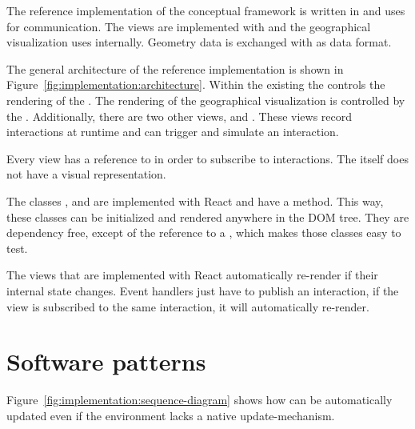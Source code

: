 The reference implementation of the conceptual framework is written in  and uses  for communication.
The views are implemented with  and the geographical visualization uses  internally.
Geometry data is exchanged with  as data format.

The general architecture of the reference implementation is shown in Figure~\ref{fig:implementation:architecture}.
Within the existing \visan{} the  controls the rendering of the \tmap{}.
The rendering of the geographical visualization is controlled by the .
Additionally, there are two other views,  and .
These views record interactions at runtime and can trigger and simulate an interaction.

Every view has a reference to  in order to subscribe to interactions.
The  itself does not have a visual representation.

The classes ,  and  are implemented with React and have a  method.
This way, these classes can be initialized and rendered anywhere in the DOM tree.
They are dependency free, except of the reference to a , which makes those classes easy to test.

The views that are implemented with React automatically re-render if their internal state changes.
Event handlers just have to publish an interaction, if the view is subscribed to the same interaction, it will automatically re-render.

\section{Software patterns}\label{sec:implementation:patterns}
Figure~\ref{fig:implementation:sequence-diagram} shows how \cmvs{} can be automatically updated even if the environment lacks a native update-mechanism.

